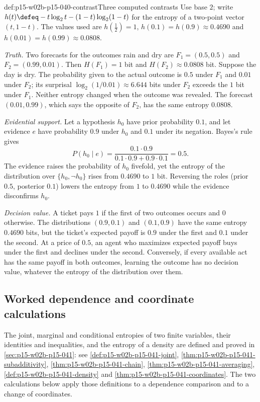 \begin{hbexample}{def:p15-w02b-p15-040-contrast}{Three computed contrasts}
Use base \(2\); write \(h(t)\defeq-t\log_2t-(1-t)\log_2(1-t)\) for
the entropy of a two-point vector \((t,1-t)\). The values used are
\(h(\tfrac12)=1\), \(h(0.1)=h(0.9)\approx0.4690\) and
\(h(0.01)=h(0.99)\approx0.0808\).

\emph{Truth.} Two forecasts for the outcomes rain and dry are
\(F_1=(0.5,0.5)\) and \(F_2=(0.99,0.01)\). Then \(H(F_1)=1\) bit and
\(H(F_2)\approx0.0808\) bit. Suppose the day is dry. The probability
given to the actual outcome is \(0.5\) under \(F_1\) and \(0.01\) under
\(F_2\); its surprisal \(\log_2(1/0.01)\approx6.644\) bits under \(F_2\)
exceeds the \(1\) bit under \(F_1\). Neither entropy changed when the
outcome was revealed. The forecast \((0.01,0.99)\), which says the
opposite of \(F_2\), has the same entropy \(0.0808\).

\emph{Evidential support.} Let a hypothesis \(h_0\) have prior
probability \(0.1\), and let evidence \(e\) have probability \(0.9\)
under \(h_0\) and \(0.1\) under its negation. Bayes's rule gives
\[
 P(h_0\mid e)=\frac{0.1\cdot0.9}{0.1\cdot0.9+0.9\cdot0.1}=0.5 .
\]
The evidence raises the probability of \(h_0\) fivefold, yet the entropy
of the distribution over \(\{h_0,\neg h_0\}\) rises from \(0.4690\) to
\(1\) bit. Reversing the roles (prior \(0.5\), posterior \(0.1\))
lowers the entropy from \(1\) to \(0.4690\) while the evidence
disconfirms \(h_0\).

\emph{Decision value.} A ticket pays \(1\) if the first of two outcomes
occurs and \(0\) otherwise. The distributions \((0.9,0.1)\) and
\((0.1,0.9)\) have the same entropy \(0.4690\) bits, but the ticket's
expected payoff is \(0.9\) under the first and \(0.1\) under the second.
At a price of \(0.5\), an agent who maximizes expected payoff buys under
the first and declines under the second. Conversely, if every available act has the same
payoff in both outcomes, learning the outcome has no decision value,
whatever the entropy of the distribution over them.
\end{hbexample}

\subsection{Worked dependence and coordinate calculations}
\label{sec:p15-w02b-p15-040-worked}

The joint, marginal and conditional entropies of two finite variables,
their identities and inequalities, and the entropy of a density are
defined and proved in \cref{sec:p15-w02b-p15-041}: see
\cref{def:p15-w02b-p15-041-joint}, \cref{thm:p15-w02b-p15-041-subadditivity},
\cref{thm:p15-w02b-p15-041-chain}, \cref{thm:p15-w02b-p15-041-averaging},
\cref{def:p15-w02b-p15-041-density} and
\cref{thm:p15-w02b-p15-041-coordinates}. The two calculations below
apply those definitions to a dependence comparison and to a change of
coordinates.

